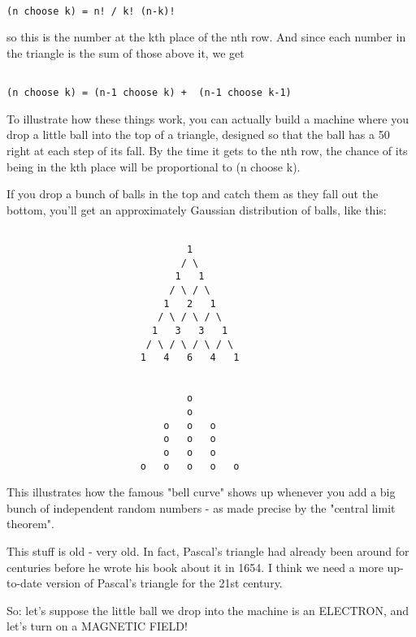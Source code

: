 \begin{verbatim}

(n choose k) = n! / k! (n-k)!
\end{verbatim}
    
so this is the number at the kth place of the nth row.  And since
each number in the triangle is the sum of those above it, we get


\begin{verbatim}

(n choose k) = (n-1 choose k) +  (n-1 choose k-1)
\end{verbatim}
    
To illustrate how these things work, you can actually build a machine
where you drop a little ball into the top of a triangle, designed so 
that the ball has a 50%
right at each step of its fall.  By the time it gets to the nth row, the 
chance of its being in the kth place will be proportional to (n choose k).  

If you drop a bunch of balls in the top and catch them as they fall out
the bottom, you'll get an approximately Gaussian distribution of balls,
like this:


\begin{verbatim}

                               1
                              / \
                             1   1
                            / \ / \
                           1   2   1
                          / \ / \ / \
                         1   3   3   1
                        / \ / \ / \ / \
                       1   4   6   4   1


                               o
                               o
                           o   o   o   
                           o   o   o   
                           o   o   o   
                       o   o   o   o   o
\end{verbatim}
    
This illustrates how the famous "bell curve" shows up whenever you 
add a big bunch of independent random numbers - as made precise by
the "central limit theorem".

This stuff is old - very old.  In fact, Pascal's triangle had already
been around for centuries before he wrote his book about it in 1654.  
I think we need a more up-to-date version of Pascal's triangle for the
21st century.

So: let's suppose the little ball we drop into the machine is an
ELECTRON, and let's turn on a MAGNETIC FIELD!

